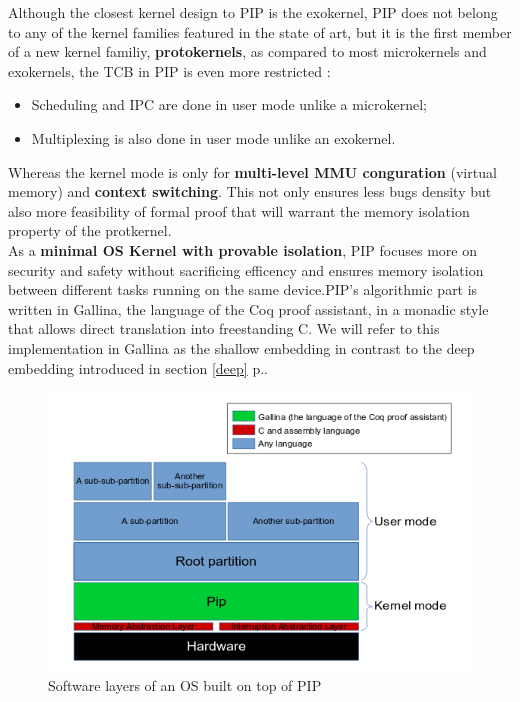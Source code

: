 \noindent Although the closest kernel design to PIP is the exokernel, PIP does not belong to any of the kernel families featured in the state of art, but it is the first member of a new kernel familiy, \textbf{protokernels}, as compared to most microkernels and exokernels, the TCB in PIP is even more restricted :
\begin{itemize}
	\item Scheduling and IPC are done in user mode unlike a microkernel;
	\item Multiplexing is also done in user mode unlike an exokernel.
\end{itemize}

\noindent Whereas the kernel mode is only for \textbf{multi-level MMU conguration} (virtual memory) and \textbf{context switching}. This not only ensures less bugs density but also more feasibility of formal proof that will warrant the memory isolation property of the protkernel. \\

As a \textbf{minimal OS Kernel with provable isolation}, PIP focuses more on security and safety without sacrificing efficency and ensures memory isolation between different tasks running on the same device.PIP's algorithmic part is written in Gallina, the language of the Coq proof assistant, in a monadic style that allows direct translation into freestanding C. We will refer to this implementation in Gallina as the shallow embedding in contrast to the deep embedding introduced in section \ref{deep} p.\pageref{deep}. 

\begin{figure}[!ht]
	\centering 
	\includegraphics[width=\linewidth ,frame]{img/OSLayersPIP.png} 
	\caption{Software layers of an OS built on top of PIP}
\end{figure}

